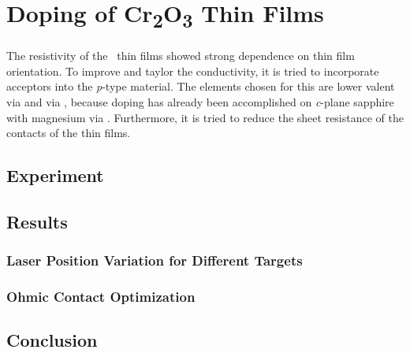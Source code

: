 \section{Doping of \texorpdfstring{C\lowercase{r}\textsubscript{2}O\textsubscript{3}}{Cr2O3} Thin Films}
    \label{Sec:Results_Doping}
The resistivity of the \cro\ thin films showed strong dependence on thin film orientation.
To improve and taylor the conductivity, it is tried to incorporate acceptors into the \textit{p}-type material.
The elements chosen for this are lower valent  via  and  via , because doping has already been accomplished on \textit{c}-plane sapphire with magnesium via 
    \cite{farrell2015}.
Furthermore, it is tried to reduce the sheet resistance of the contacts of the thin films.

\subsection{Experiment}
    
\subsection{Results}
    \subsubsection{Laser Position Variation for Different Targets}
        
    \subsubsection{Ohmic Contact Optimization}
        
\subsection{Conclusion}
    